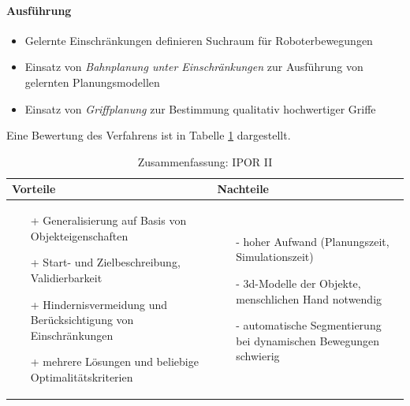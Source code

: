 \paragraph*{Ausführung}
\begin{itemize}
\item Gelernte Einschränkungen definieren Suchraum für Roboterbewegungen
\item Einsatz von \textit{Bahnplanung unter Einschränkungen} zur Ausführung von gelernten
Planungsmodellen
\item Einsatz von \textit{Griffplanung} zur Bestimmung qualitativ hochwertiger Griffe
\end{itemize}
Eine Bewertung des Verfahrens ist in Tabelle \ref{tab:ipo} dargestellt.
\begin{table}[hbt]
\centering
\begin{tabular}{|p{6.5cm}|p{6.5cm}|}
\hline
Vorteile & Nachteile\\
\hline
\vspace{-5mm}
\begin{itemize}
\setlength\itemsep{0em}
\item[+] Generalisierung auf Basis von Objekteigenschaften
\item[+] Start- und Zielbeschreibung, Validierbarkeit
\item[+] Hindernisvermeidung und Berücksichtigung von Einschränkungen
\item[+] mehrere Lösungen und beliebige Optimalitätskriterien
\end{itemize}
 &
 \vspace{-5mm}
\begin{itemize}
\setlength\itemsep{0em}
\item[-] hoher Aufwand (Planungszeit, Simulationszeit)
\item[-] 3d-Modelle der Objekte, menschlichen Hand notwendig
\item[-] automatische Segmentierung bei dynamischen Bewegungen schwierig
\end{itemize}\\
\hline
\end{tabular}
\caption{Zusammenfassung: IPOR II}
\label{tab:ipo}
\end{table}\\ 
